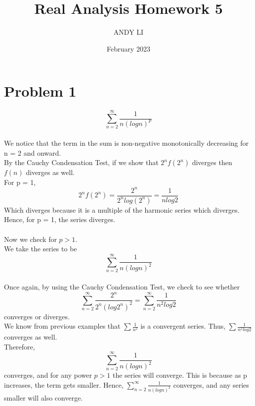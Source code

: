 \documentclass{article}
\title{Real Analysis Homework 5}
\author{ANDY LI}
\date{February 2023}
\begin{document}
\maketitle

\section*{Problem 1}
$$\sum_{n=2}^{\infty} \frac{1}{n(logn)^p}$$
\\We notice that the term in the sum is non-negative monotonically decreasing for n = 2 and onward.
\\By the Cauchy Condensation Test, if we show that $2^nf(2^n)$ diverges then $f(n)$ diverges as well.
\\For p = 1,
$$2^nf(2^n) = \frac{2^n}{2^nlog(2^n)} = \frac{1}{nlog2}$$ Which diverges because it is a multiple of the harmonic series which diverges.
\\Hence, for p = 1, the series diverges.
\\
\\Now we check for $p > 1$.
\\We take the series to be $$\sum_{n=2}^{\infty} \frac{1}{n(logn)^2}$$
\\Once again, by using the Cauchy Condensation Test, we check to see whether $$\sum_{n=2}^{\infty} \frac{2^n}{2^n(log2^n)^2} = \sum_{n=2}^{\infty} \frac{1}{n^2log2}$$ converges or diverges.
\\We know from previous examples that $\sum\frac{1}{n^2}$ is a convergent series. Thus, $\sum\frac{1}{n^2log2}$ converges as well.
\\Therefore, $$\sum_{n=2}^{\infty} \frac{1}{n(logn)^2}$$ converges, and for any power $p > 1$ the series will converge. This is because as p increases, the term gets smaller. Hence, $\sum_{n=2}^{\infty} \frac{1}{n(logn)^2}$ converges, and any series smaller will also converge.
\end{document}
